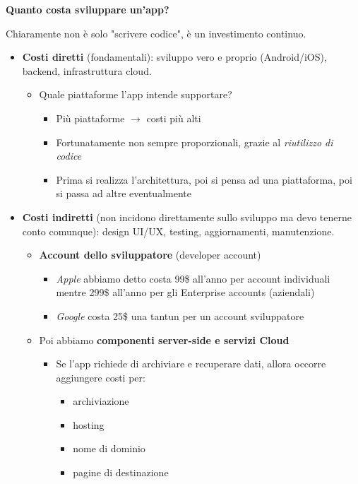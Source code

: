 \par \textbf{Quanto costa sviluppare un'app?}
\par Chiaramente non è solo "scrivere codice", è un investimento continuo.
\begin{itemize}
    \item \textbf{Costi diretti} (fondamentali): sviluppo vero e proprio (Android/iOS), backend, infrastruttura cloud.
    \begin{itemize}
        \item Quale piattaforme l'app intende supportare?
        \begin{itemize}
            \item Più piattaforme $\rightarrow$ costi più alti 
            \item Fortunatamente non sempre proporzionali, grazie al \textit{riutilizzo di codice}
            \item Prima si realizza l'architettura, poi si pensa ad una piattaforma, poi si passa ad altre eventualmente
        \end{itemize}
    \end{itemize}
    \item \textbf{Costi indiretti} (non incidono direttamente sullo sviluppo ma devo tenerne conto comunque): design UI/UX, testing, aggiornamenti, manutenzione.
    \begin{itemize}
        \item \textbf{Account dello sviluppatore} (developer account)
        \begin{itemize}
            \item \textit{Apple} abbiamo detto costa 99\$ all'anno per account individuali mentre 299\$ all'anno per gli Enterprise accounts (aziendali)
            \item \textit{Google} costa 25\$ una tantun per un account sviluppatore
        \end{itemize}
        \item Poi abbiamo \textbf{componenti server-side e servizi Cloud}
        \begin{itemize}
            \item Se l'app richiede di archiviare e recuperare dati, allora occorre aggiungere costi per:
            \begin{itemize}
                \item archiviazione
                \item hosting
                \item nome di dominio
                \item pagine di destinazione

\end{itemize}
\end{itemize}
\end{itemize}
\end{itemize}
